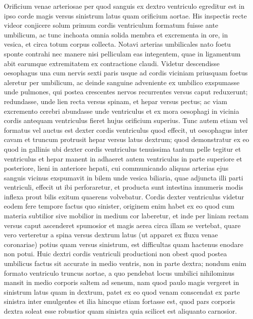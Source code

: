 \pend%
\pstart%
Orificium venae arteriosae per quod sanguis ex dextro ventriculo egreditur est in ipso corde magis versus sinistrum latus quam orificium aortae. His inspectis recte videor conjicere solum primum cordis ventriculum formatum fuisse ante umbilicum, ac tunc inchoata omnia solida membra et excrementa in ore, in vesica, et circa totum corpus collecta.
\pend%
\pstart%
Notavi arterias umbilicales nato foetu sponte contrahi nec manere nisi pelliculam eas integentem, quae in ligamentum abit earumque extremitatem ex contractione claudi. Videtur descendisse oesophagus una cum nervis sexti paris usque ad cordis viciniam priusquam foetus aleretur per umbilicum, ac deinde sanguine adveniente ex umbilico exspumasse unde pulmones, qui postea crescentes nervos recurrentes versus caput reduxerunt; redundasse, unde lien recta versus spinam, et hepar versus pectus; ac viam excremento cerebri abundasse unde ventriculus et ex mora oesophagi in vicinia cordis antequam ventriculus fieret hujus orificium superius. Tunc autem etiam vel formatus vel auctus est dexter cordis ventriculus quod effecit, ut oesophagus inter cavam et truncum 
\pend
\newpage
\pstart\noindent protrusit hepar versus latus dextrum; quod demonstratur ex eo quod in gallinis ubi dexter cordis ventriculus tenuissima tantum pelle tegitur et ventriculus et hepar manent in 
adhaeret autem ventriculus in parte superiore et posteriore, lieni in anteriore hepati, cui communicando aliquas arterias ejus sanguis vicinus exspumavit in bilem unde vesica biliaria, quae adjuncta illi parti ventriculi, effecit ut ibi perforaretur, et producta sunt intestina innumeris modis inflexa prout bilis exitum quaerens volvebatur.
\pend%
\pstart%
Cordis dexter ventriculus videtur eodem fere tempore factus quo sinister, originem enim habet ex eo quod cum materia subtilior sive mobilior in medium cor laberetur, et inde per liniam rectam versus caput ascenderet spumosior et magis aerea circa illam se vertebat, quare vero verteretur a spina versus dextrum latus (ut apparet ex fluxu venae coronariae) potius quam versus sinistrum, est difficultas quam hactenus enodare non potui. Huic dextri cordis ventriculi productioni non obest quod postea umbilicus factus sit accurate in medio ventris, non in parte dextra; nondum enim formato ventriculo truncus aortae, a quo pendebat locus umbilici nihilominus mansit in medio corporis saltem ad sensum, nam quod paulo magis vergeret in sinistrum latus quam in dextrum, patet ex eo quod venam conscendat ex parte sinistra inter emulgentes et ilia hincque etiam fortasse est, quod pars corporis dextra soleat esse robustior quam sinistra quia scilicet est aliquanto carnosior.
